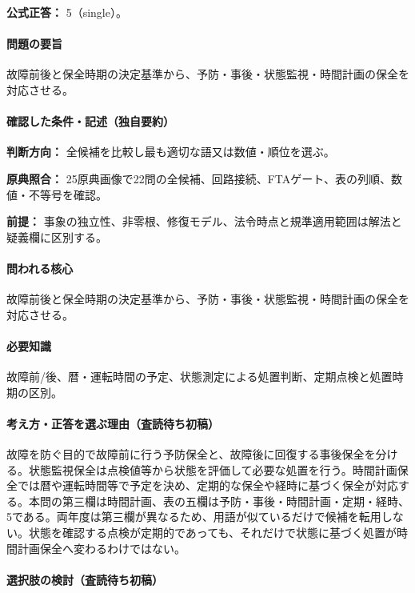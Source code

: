\textbf{公式正答：} 5（single）。

\paragraph{問題の要旨} 故障前後と保全時期の決定基準から、予防・事後・状態監視・時間計画の保全を対応させる。

\paragraph{確認した条件・記述（独自要約）}\mbox{}\par

\noindent\textbf{判断方向：} 全候補を比較し最も適切な語又は数値・順位を選ぶ。\par

\noindent\textbf{原典照合：} 25原典画像で22問の全候補、回路接続、FTAゲート、表の列順、数値・不等号を確認。\par

\noindent\textbf{前提：} 事象の独立性、非零根、修復モデル、法令時点と規準適用範囲は解法と疑義欄に区別する。\par

\paragraph{問われる核心} 故障前後と保全時期の決定基準から、予防・事後・状態監視・時間計画の保全を対応させる。

\paragraph{必要知識} 故障前/後、暦・運転時間の予定、状態測定による処置判断、定期点検と処置時期の区別。

\paragraph{考え方・正答を選ぶ理由（査読待ち初稿）} 故障を防ぐ目的で故障前に行う予防保全と、故障後に回復する事後保全を分ける。状態監視保全は点検値等から状態を評価して必要な処置を行う。時間計画保全では暦や運転時間等で予定を決め、定期的な保全や経時に基づく保全が対応する。本問の第三欄は時間計画、表の五欄は予防・事後・時間計画・定期・経時、5である。両年度は第三欄が異なるため、用語が似ているだけで候補を転用しない。状態を確認する点検が定期的であっても、それだけで状態に基づく処置が時間計画保全へ変わるわけではない。

\paragraph{選択肢の検討（査読待ち初稿）}\mbox{}\par

